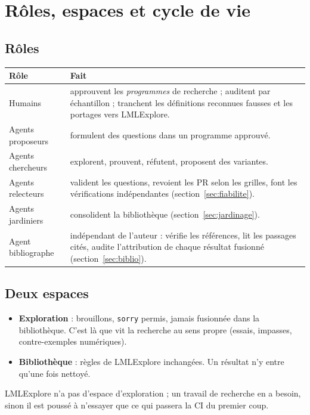 \documentclass[11pt,a4paper]{article}
\newcommand{\lmlx}{\textsf{LMLExplore}}
\begin{document}
\section{Rôles, espaces et cycle de vie}

\subsection{Rôles}

\begin{center}
\begin{tabularx}{\linewidth}{@{}lX@{}}
\toprule
Rôle & Fait \\
\midrule
Humains & approuvent les \emph{programmes} de recherche ; auditent par échantillon ; tranchent les
  définitions reconnues fausses et les portages vers \lmlx{}. \\
Agents proposeurs & formulent des questions dans un programme approuvé. \\
Agents chercheurs & explorent, prouvent, réfutent, proposent des variantes. \\
Agents relecteurs & valident les questions, revoient les PR selon les grilles, font les vérifications
  indépendantes (section~\ref{sec:fiabilite}). \\
Agents jardiniers & consolident la bibliothèque (section~\ref{sec:jardinage}). \\
Agent bibliographe & indépendant de l'auteur : vérifie les références, lit les passages cités, audite
  l'attribution de chaque résultat fusionné (section~\ref{sec:biblio}). \\
\bottomrule
\end{tabularx}
\end{center}

\subsection{Deux espaces}

\begin{itemize}
\item \textbf{Exploration} : brouillons, \texttt{sorry} permis, jamais fusionnée dans la bibliothèque.
  C'est là que vit la recherche au sens propre (essais, impasses, contre-exemples numériques).
\item \textbf{Bibliothèque} : règles de \lmlx{} inchangées. Un résultat n'y entre qu'une fois nettoyé.
\end{itemize}
\lmlx{} n'a pas d'espace d'exploration ; un travail de recherche en a besoin, sinon il est poussé
à n'essayer que ce qui passera la CI du premier coup.
\end{document}
